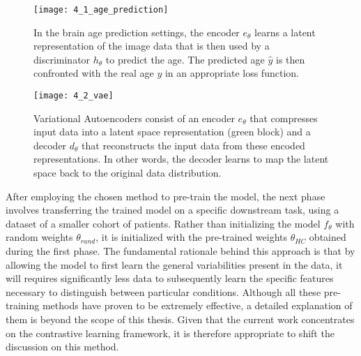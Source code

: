 \begin{figure*}
    \begin{subfigure}[t]{.45\linewidth}
        \texttt{[image: 4\_1\_age\_prediction]}
        \caption[Brain Age Prediction Pretraining]{In the brain age prediction
        settings, the encoder $e_\theta$ learns a latent representation of the
        image data that is then used by a discriminator $h_\theta$ to predict
        the age. The predicted age $\hat{y}$ is then confronted with the real
        age $y$ in an appropriate loss function.}
    \end{subfigure}
    \hfill
    \begin{subfigure}[t]{.45\linewidth}
        \texttt{[image: 4\_2\_vae]}
        \caption[Variational Autoencoder Pretraining]{Variational Autoencoders
        consist of an encoder $e_\theta$ that compresses input data into a
        latent space representation (green block) and a decoder $d_\theta$ that
        reconstructs the input data from these encoded representations. In other
        words, the decoder learns to map the latent space back to the original
        data distribution.}
    \end{subfigure}
\end{figure*}
After employing the chosen method to pre-train the model, the next phase
involves transferring the trained model on a specific downstream task, using a
dataset of a smaller cohort of patients. Rather than initializing the model
$f_\theta$ with random weights $\theta_{rand}$, it is initialized with the
pre-trained weights $\theta_{HC}$ obtained during the first phase. The
fundamental rationale behind this approach is that by allowing the model to
first learn the general variabilities present in the data, it will requires
significantly less data to subsequently learn the specific features necessary to
distinguish between particular conditions. Although all these pre-training
methods have proven to be extremely effective, a detailed explanation of them is
beyond the scope of this thesis. Given that the current work concentrates on the
contrastive learning framework, it is therefore appropriate to shift the
discussion on this method.

